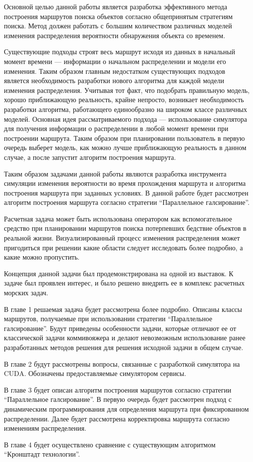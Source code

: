 \startprefacepage

Основной целью данной работы является разработка эффективного метода построения маршрутов поиска
объектов согласно общепринятым стратегиям поиска. Метод должен работать с большим количеством
различных моделей изменения распределения вероятности обнаружения объекта со временем. %
 
 Существующие подходы строят весь маршрут исходя из данных в начальный момент
времени --- информации о начальном распределении и модели его изменения.
Таким образом главным недостатком существующих подходов является необходимость
разработки нового алгоритма для каждой модели изменения распределения.
Учитывая тот факт, что подобрать правильную модель, хорошо приближающую реальность,
 крайне непросто, возникает необходимость разработки алгоритма,
 работающего единообразно на широком классе различных моделей.
 Основная идея рассматриваемого подхода --- использование симулятора для получения %
 информации о распределении в любой момент времени при построении маршрута.
 Таким образом при планировании пользователь в первую очередь выберет модель,
 как можно лучше приближающую реальность в данном случае, а после запустит
 алгоритм построения маршрута.

 Таким образом задачами данной работы являются разработка инструмента симуляции изменения
вероятности во время прохождения маршрута и алгоритма построения маршрута при заданных условиях.
В данной работе будет рассмотрен алгоритм построения маршрута согласно
 стратегии ``Параллельное галсирование''.

Расчетная задача может быть использована оператором как вспомогательное средство
при планировании маршрутов поиска потерпевших бедствие объектов в реальной жизни.
Визуализированный процесс изменения распределения может пригодиться при решении какие области
следует исследовать более подробно, а какие можно пропустить.

Концепция данной задачи был продемонстрирована на одной из выставок. К задаче был проявлен 
интерес, и было решено внедрить ее в комплекс расчетных морских задач. %

В главе 1 решаемая задача будет рассмотрена более подробно.
 Описаны классы маршрутов, получаемые при использовании стратегии ``Параллельное галсирование''. 
Будут приведены особенности задачи, которые отличают ее от классической задачи коммивояжера
 и делают невозможным использование ранее разработанных методов решения
 для решения исходной задачи в общем случае.

В главе 2 будут рассмотрены вопросы, связанные с разработкой симулятора на CUDA.
 Обозначены предоставляемые симулятором сервисы.

В главе 3 будет описан алгоритм построения маршрутов согласно стратегии ``Параллельное галсирование''.
В первую очередь будет рассмотрен подход с динамическим программирования для определения
маршрута при фиксированном распределении. Далее будет рассмотрена корректировка маршрута
согласно изменениям распределения.

В главе 4 будет осуществлено сравнение с существующим алгоритмом ``Кронштадт технологии''.
\FloatBarrier
